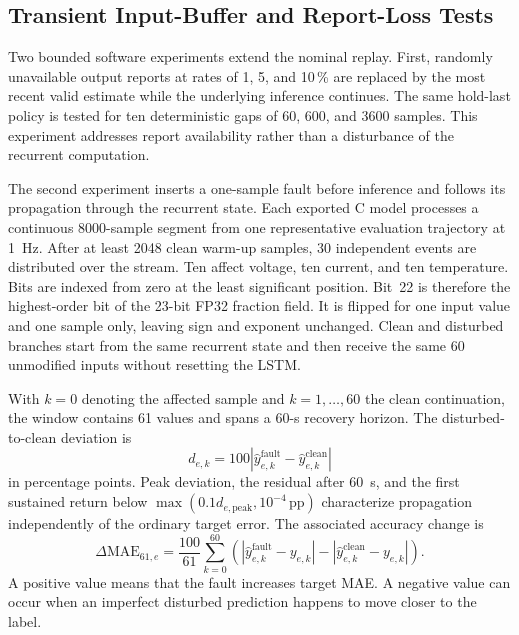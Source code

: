 \documentclass[
    a4paper,
    12pt,
    titlepage,
    bibliography=totoc,
    twoside=on,
    parskip=false,
    numbers=noenddot,
    cleardoublepage=empty,
    DIV=12,
    BCOR=12.0mm,
    headheight=36pt,
    headings=openright
]{scrreprt}
\begin{document}
\subsection{Transient Input-Buffer and Report-Loss Tests}
Two bounded software experiments extend the nominal replay. First, randomly unavailable output reports at rates of 1, 5, and 10\,\% are replaced by the most recent valid estimate while the underlying inference continues. The same hold-last policy is tested for ten deterministic gaps of 60, 600, and 3600 samples. This experiment addresses report availability rather than a disturbance of the recurrent computation.

The second experiment inserts a one-sample fault before inference and follows its propagation through the recurrent state. Each exported C model processes a continuous 8000-sample segment from one representative evaluation trajectory at \SI{1}{\hertz}. After at least 2048 clean warm-up samples, 30 independent events are distributed over the stream. Ten affect voltage, ten current, and ten temperature. Bits are indexed from zero at the least significant position. Bit~22 is therefore the highest-order bit of the 23-bit FP32 fraction field. It is flipped for one input value and one sample only, leaving sign and exponent unchanged. Clean and disturbed branches start from the same recurrent state and then receive the same 60 unmodified inputs without resetting the LSTM.

With $k=0$ denoting the affected sample and $k=1,\ldots,60$ the clean continuation, the window contains 61 values and spans a 60-s recovery horizon. The disturbed-to-clean deviation is
\begin{equation}
    d_{e,k}=100\left|\hat y^{\mathrm{fault}}_{e,k}-\hat y^{\mathrm{clean}}_{e,k}\right|
\end{equation}
in percentage points. Peak deviation, the residual after 60~s, and the first sustained return below $\max(0.1d_{e,\mathrm{peak}},10^{-4}\,\mathrm{pp})$ characterize propagation independently of the ordinary target error. The associated accuracy change is
\begin{equation}
    \Delta\mathrm{MAE}_{61,e}
    =\frac{100}{61}\sum_{k=0}^{60}
    \left(
    \left|\hat y^{\mathrm{fault}}_{e,k}-y_{e,k}\right|
    -\left|\hat y^{\mathrm{clean}}_{e,k}-y_{e,k}\right|
    \right).
    \label{eq:embedded_fault_mae_change}
\end{equation}
A positive value means that the fault increases target MAE. A negative value can occur when an imperfect disturbed prediction happens to move closer to the label.
\end{document}
